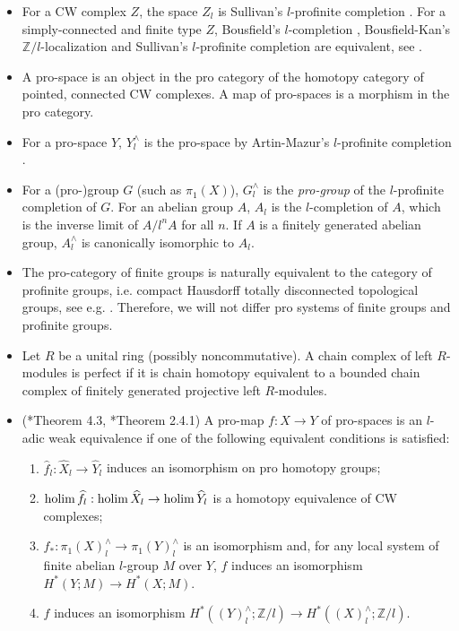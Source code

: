 \documentclass[11pt]{amsart}
\theoremstyle{definition}
\numberwithin{equation}{section}
\numberwithin{equation}{section}
\newcommand\ZZ{\mathbb{Z}}
\DeclareMathOperator{\et}{\acute{e}t}
\def\holim{\qopname\relax m{holim}}
\begin{document}
\begin{itemize}[leftmargin=0.25in]
    \item For a CW complex $Z$, the space $Z_l$ is Sullivan's $l$-profinite completion \cite{Sullivan-adams-conjecture}. 
    For a simply-connected and finite type $Z$, Bousfield's $l$-completion \cite{Bousfield-localization-of-spaces}, Bousfield-Kan's $\ZZ/l$-localization \cite{Bousfield-Kan} and Sullivan's $l$-profinite completion are equivalent, see \cite[\S2.3]{Barthel-Bousfield-Comparison-of-p-completion}.
    \item A pro-space is an object in the pro category of the homotopy category of pointed, connected CW complexes. A map of pro-spaces is a morphism in the pro category.
    \item For a pro-space $Y$, $Y^{\wedge}_l$ is the pro-space by Artin-Mazur's $l$-profinite completion \cite{artin-mazur-etale-homotopy}.
    \item For a (pro-)group $G$ (such as $\pi^{\et}_1(X)$), $G^{\wedge}_l$ is the \textit{pro-group} of the $l$-profinite completion of $G$. For an abelian group $A$, $A_l$ is the $l$-completion of $A$, which is the inverse limit of $A/l^nA$ for all $n$. If $A$ is a finitely generated abelian group, $A^{\wedge}_l$ is canonically isomorphic to $A_l$. 
    \item The pro-category of finite groups is naturally equivalent to the category of profinite groups, i.e. compact Hausdorff totally disconnected topological groups, see e.g. \cite[Prop. 3.2.12]{Lurie-rational-p-profinite}. Therefore, we will not differ pro systems of finite groups and profinite groups.
    \item Let $R$ be a unital ring (possibly noncommutative). A chain complex of left $R$-modules is perfect if it is chain homotopy equivalent to a bounded chain complex of finitely generated projective left $R$-modules.
    \item (\cite{artin-mazur-etale-homotopy}*{Theorem 4.3}, \cite{morel1993quelques}*{Theorem 2.4.1}) A pro-map $f:X\rightarrow Y$ of pro-spaces is an $l$-adic weak equivalence if one of the following equivalent conditions is satisfied:
\begin{enumerate}
    \item $\widehat{f}_l:\widehat{X}_l\rightarrow \widehat{Y}_l$ induces an isomorphism on pro homotopy groups;
    \item $\holim\widehat{f}_l:\holim\widehat{X}_l\rightarrow \holim\widehat{Y}_l$ is a homotopy equivalence of CW complexes;
    \item $f_*:\pi_1(X)^{\wedge}_l\rightarrow \pi_1(Y)^{\wedge}_l$ is an isomorphism and, for any local system of finite abelian $l$-group $M$ over $Y$, $f$ induces an isomorphism $H^*(Y;M)\rightarrow H^*(X;M)$.
    \item $f$ induces an isomorphism $H^*((Y)^{\wedge}_l;\ZZ/l)\rightarrow H^*((X)^{\wedge}_l;\ZZ/l)$.
\end{enumerate}
\end{itemize}
\end{document}
